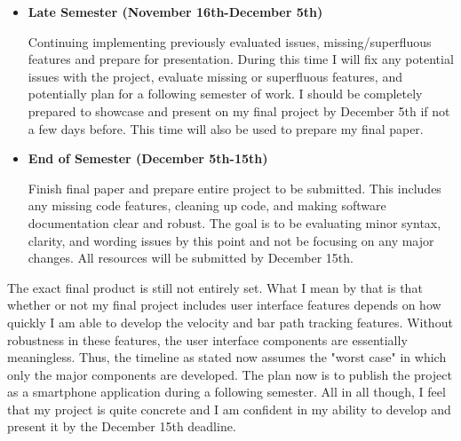 \documentclass[10pt,twocolumn]{article}
\begin{document}
\begin{itemize}
    \item\textbf{Late Semester (November 16th-December 5th)}
    
    Continuing implementing previously evaluated issues, missing/superfluous features and prepare for presentation. During this time I will fix any potential issues with the project, evaluate missing or superfluous features, and potentially plan for a following semester of work. I should be completely prepared to showcase and present on my final project by December 5th if not a few days before. This time will also be used to prepare my final paper.
    
    \item\textbf{End of Semester (December 5th-15th)}
    
    Finish final paper and prepare entire project to be submitted. This includes any missing code features, cleaning up code, and making software documentation clear and robust. The goal is to be evaluating minor syntax, clarity, and wording issues by this point and not be focusing on any major changes. All resources will be submitted by December 15th.
\end{itemize}

The exact final product is still not entirely set. 
What I mean by that is that whether or not my final project includes user interface features depends on how quickly I am able to develop the velocity and bar path tracking features. 
Without robustness in these features, the user interface components are essentially meaningless. 
Thus, the timeline as stated now assumes the "worst case" in which only the major components are developed.
The plan now is to publish the project as a smartphone application during a following semester.
All in all though, I feel that my project is quite concrete and I am confident in my ability to develop and present it by the December 15th deadline.

\printbibliography 
\end{document}
